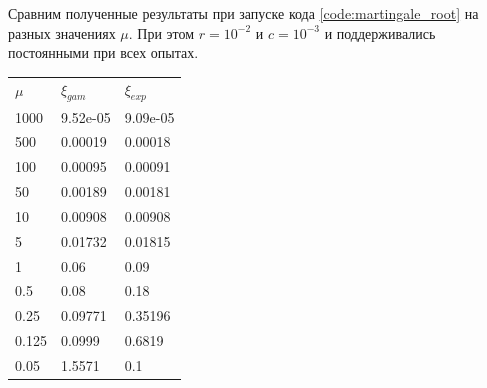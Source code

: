 \documentclass[a4paper,12pt]{article}
\theoremstyle{definition}
\begin{document}
Сравним полученные результаты при запуске кода \ref{code:martingale_root} на разных значениях $\mu$. При этом $r = 10^{-2}$ и $c = 10^{-3}$ и поддерживались постоянными при всех опытах. 

\begin{table}[H]
\centering
\begin{tabular}{lll}
\rowcolor[rgb]{0.776,0.325,0.325} {\cellcolor[rgb]{0.875,0.624,0.624}}$\mu$ & $\xi_{gam}$                                    & $\xi_{exp}$                               \\
1000                                                                       & \textcolor[rgb]{0.129,0.129,0.129}{9.52e-05} & \textcolor[rgb]{0.129,0.129,0.129}{9.09e-05}  \\
500                                                                        & \textcolor[rgb]{0.129,0.129,0.129}{0.00019}  & \textcolor[rgb]{0.129,0.129,0.129}{0.00018}   \\
100                                                                        & \textcolor[rgb]{0.129,0.129,0.129}{0.00095}  & \textcolor[rgb]{0.129,0.129,0.129}{0.00091}   \\
50                                                                         & \textcolor[rgb]{0.129,0.129,0.129}{0.00189}  & \textcolor[rgb]{0.129,0.129,0.129}{0.00181}   \\
10                                                                         & \textcolor[rgb]{0.129,0.129,0.129}{0.00908}  & \textcolor[rgb]{0.129,0.129,0.129}{0.00908}   \\
5                                                                          & \textcolor[rgb]{0.129,0.129,0.129}{0.01732}  & \textcolor[rgb]{0.129,0.129,0.129}{0.01815}   \\
1                                                                          & \textcolor[rgb]{0.129,0.129,0.129}{0.06}     & \textcolor[rgb]{0.129,0.129,0.129}{0.09}      \\
0.5                                                                        & \textcolor[rgb]{0.129,0.129,0.129}{0.08}     & 0.18                                          \\
0.25                                                                       & \textcolor[rgb]{0.129,0.129,0.129}{0.09771}  & \textcolor[rgb]{0.129,0.129,0.129}{0.35196}   \\
0.125                                                                      & \textcolor[rgb]{0.129,0.129,0.129}{0.0999}   & \textcolor[rgb]{0.129,0.129,0.129}{0.6819}    \\
0.05                                                                       & \textcolor[rgb]{0.129,0.129,0.129}{1.5571}   & \textcolor[rgb]{0.129,0.129,0.129}{0.1}      
\end{tabular}
\end{table}
\end{document}

